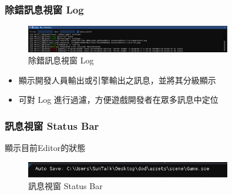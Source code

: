 

\subsubsection{除錯訊息視窗 Log}

\begin{figure}[h]
    \begin{center}
    \includegraphics[width=0.8\textwidth]{./resources/editor/logger.png}
    \end{center}
\caption{除錯訊息視窗 Log}
\end{figure}

\begin{itemize}
\item{顯示開發人員輸出或引擎輸出之訊息，並將其分級顯示}
\item{可對 Log 進行過濾，方便遊戲開發者在眾多訊息中定位}
\end{itemize}

\subsubsection{訊息視窗 Status Bar}

顯示目前Editor的狀態

\begin{figure}[h]
    \begin{center}
        \includegraphics[width=0.8\textwidth]{./resources/editor/statusbar.png}
    \end{center}
\caption{訊息視窗 Status Bar}
\end{figure}


